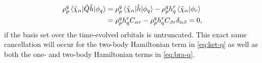         \begin{align}
            \rho^{q}_{p}\mel*{\tilde{\chi}_{\alpha}}{
                \hat{Q}\hat{h}
            }{\phi_q}
            &=
            \rho^{q}_{p}\mel*{\tilde{\chi}_{\alpha}}{
                \hat{h}
            }{\phi_q}
            - \rho^{q}_{p}h^{r}_{q}
            \braket*{\tilde{\chi}_{\alpha}}{\phi_r}
            \\
            &=
            \rho^{q}_{p}h^{r}_{q}
            C_{\alpha r}
            - \rho^{q}_{p} h^{r}_{q}
            C_{\beta r} \delta_{\alpha \beta}
            = 0,
        \end{align}
        if the basis set over the time-evolved orbitals is untruncated.
        This exact same cancellation will occur for the two-body Hamiltonian
        term in \autoref{eq:ket-q} as well as both the one- and two-body
        Hamiltonian terms in \autoref{eq:bra-q}.
